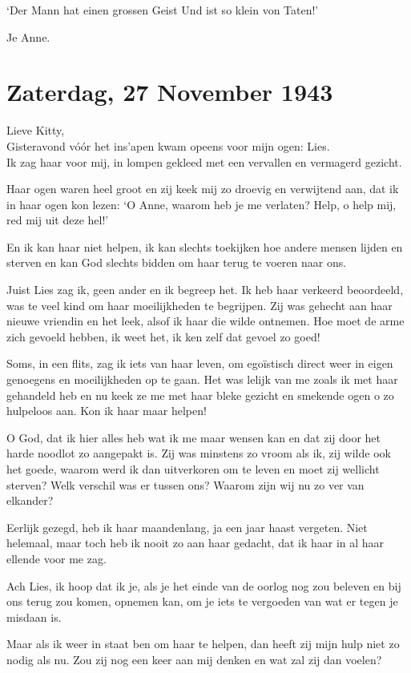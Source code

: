 \documentclass{book}
\begin{document}
`Der Mann hat einen grossen Geist Und ist so klein von Taten!'

Je Anne.

\section*{Zaterdag, 27 November 1943}

Lieve Kitty,\\
Gisteravond vóór het ins'apen kwam opeens voor mijn ogen: Lies.\\
Ik zag haar voor mij, in lompen gekleed met een vervallen en vermagerd gezicht.

Haar ogen waren heel groot en zij keek mij zo droevig en verwijtend aan, dat ik
in haar ogen kon lezen: `O Anne, waarom heb je me verlaten? Help, o help mij,
red mij uit deze hel!'

En ik kan haar niet helpen, ik kan slechts toekijken hoe andere mensen lijden en
sterven en kan God slechts bidden om haar terug te voeren naar ons.

Juist Lies zag ik, geen ander en ik begreep het. Ik heb haar verkeerd
beoordeeld, was te veel kind om haar moeilijkheden te begrijpen. Zij was gehecht
aan haar nieuwe vriendin en het leek, alsof ik haar die wilde ontnemen. Hoe moet
de arme zich gevoeld hebben, ik weet het, ik ken zelf dat gevoel zo goed!

Soms, in een flits, zag ik iets van haar leven, om egoïstisch direct weer in
eigen genoegens en moeilijkheden op te gaan. Het was lelijk van me zoals ik met
haar gehandeld heb en nu keek ze me met haar bleke gezicht en smekende ogen o zo
hulpeloos aan. Kon ik haar maar helpen!

O God, dat ik hier alles heb wat ik me maar wensen kan en dat zij door het harde
noodlot zo aangepakt is. Zij was minstens zo vroom als ik, zij wilde ook het
goede, waarom werd ik dan uitverkoren om te leven en moet zij wellicht sterven?
Welk verschil was er tussen ons? Waarom zijn wij nu zo ver van elkander?

Eerlijk gezegd, heb ik haar maandenlang, ja een jaar haast vergeten.  Niet
helemaal, maar toch heb ik nooit zo aan haar gedacht, dat ik haar in al haar
ellende voor me zag.

Ach Lies, ik hoop dat ik je, als je het einde van de oorlog nog zou beleven en
bij ons terug zou komen, opnemen kan, om je iets te vergoeden van wat er tegen
je misdaan is.

Maar als ik weer in staat ben om haar te helpen, dan heeft zij mijn hulp niet zo
nodig als nu. Zou zij nog een keer aan mij denken en wat zal zij dan voelen?
\end{document}
